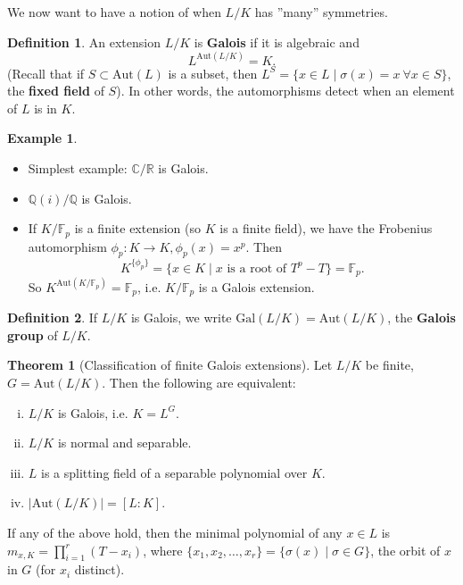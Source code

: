 \documentclass{article}
\theoremstyle{definition}
\newtheorem{theorem}{Theorem}[section]
\newtheorem{example}{Example}[section]
\newtheorem{defn}{Definition}[section]
\begin{document}
We now want to have a notion of when $L/K$ has ''many'' symmetries.
\begin{defn}
    An extension $L/K$ is \textbf{Galois} if it is algebraic and $$L^{\text{Aut}(L/K)}=K.$$ (Recall that if $S \subset \text{Aut}(L)$ is a subset, then $L^S = \{x \in L \mid \sigma(x)=x ~\forall x \in S\}$, the \textbf{fixed field} of $S$). In other words, the automorphisms detect when an element of $L$ is in $K$.
\end{defn}
\begin{example}
    \begin{itemize}
        \item Simplest example: $\mathbb{C}/\mathbb{R}$ is Galois.
        \item $\mathbb{Q}(i)/\mathbb{Q}$ is Galois.
        \item If $K/\mathbb{F}_p$ is a finite extension (so $K$ is a finite field), we have the Frobenius automorphism $\phi_p : K \to K, \phi_p(x)=x^p$. Then \[
        K^{\{\phi_p\}} = \{x \in K \mid x \text{ is a root of }T^p-T\} = \mathbb{F}_p.
        \]
        So $K^{\text{Aut}(K/\mathbb{F}_p)} = \mathbb{F}_p$, i.e. $K/\mathbb{F}_p$ is a Galois extension.
    \end{itemize}
\end{example}
\begin{defn}
    If $L/K$ is Galois, we write $\text{Gal}(L/K) = \text{Aut}(L/K)$, the \textbf{Galois group} of $L/K$.
\end{defn}
\begin{theorem}[Classification of finite Galois extensions]\label{9.2}
    Let $L/K$ be finite, $G = \text{Aut}(L/K)$. Then the following are equivalent:
    \begin{enumerate}[(i)]
        \item $L/K$ is Galois, i.e. $K=L^G$.
        \item $L/K$ is normal and separable.
        \item $L$ is a splitting field of a separable polynomial over $K$.
        \item $|\text{Aut}(L/K)|=[L:K]$.
    \end{enumerate}
    If any of the above hold, then the minimal polynomial of any $x \in L$ is $m_{x,K}=\prod_{i=1}^{r} (T-x_i)$, where $\{x_1,x_2,\ldots,x_r\} = \{\sigma(x) \mid  \sigma \in G\}$, the orbit of $x$ in $G$ (for $x_i$ distinct).
\end{theorem}
\end{document}
